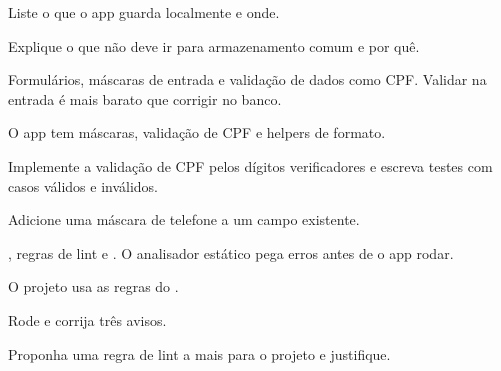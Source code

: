 \begin{pratique}
  \item Liste o que o app guarda localmente e onde.
  \item Explique o que não deve ir para armazenamento comum e por quê.
\end{pratique}

Formulários, máscaras de entrada e validação de dados como CPF. Validar na entrada é mais barato que corrigir no banco.

\begin{noproduto}
O app tem máscaras, validação de CPF e helpers de formato.
\end{noproduto}

\begin{paraestudar}
  \item {}
\end{paraestudar}

\begin{pratique}
  \item Implemente a validação de CPF pelos dígitos verificadores e escreva testes com casos válidos e inválidos.
  \item Adicione uma máscara de telefone a um campo existente.
\end{pratique}

, regras de lint e . O analisador estático pega erros antes de o app rodar.

\begin{noproduto}
O projeto usa as regras do .
\end{noproduto}

\begin{paraestudar}
  \item {}
\end{paraestudar}

\begin{pratique}
  \item Rode  e corrija três avisos.
  \item Proponha uma regra de lint a mais para o projeto e justifique.
\end{pratique}



